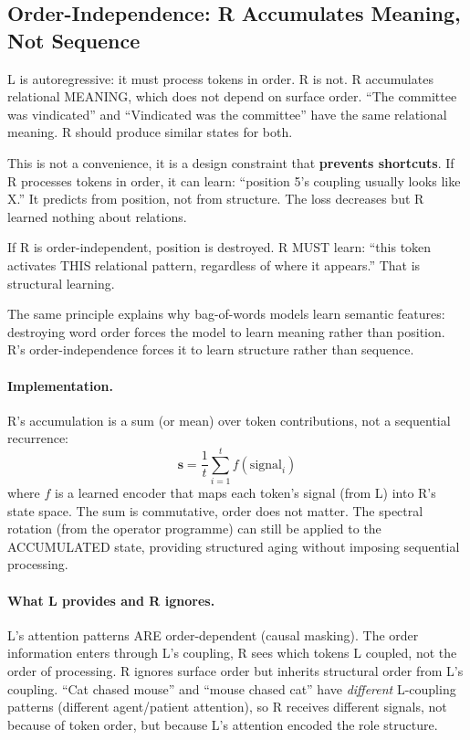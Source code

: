 \documentclass[11pt, a4paper]{article}
\theoremstyle{plain}
\theoremstyle{definition}
\theoremstyle{remark}
\begin{document}
\subsection{Order-Independence: R Accumulates Meaning, Not Sequence}
\label{sec:order-independence}

L is autoregressive: it must process tokens in order.
R is not.
R accumulates relational MEANING, which does not depend on surface order.
``The committee was vindicated'' and ``Vindicated was the committee'' have the same relational meaning.
R should produce similar states for both.

This is not a convenience, it is a design constraint that \textbf{prevents shortcuts}.
If R processes tokens in order, it can learn: ``position 5's coupling usually looks like X.''
It predicts from position, not from structure.
The loss decreases but R learned nothing about relations.

If R is order-independent, position is destroyed.
R MUST learn: ``this token activates THIS relational pattern, regardless of where it appears.''
That is structural learning.

The same principle explains why bag-of-words models learn semantic features: destroying word order forces the model to learn meaning rather than position.
R's order-independence forces it to learn structure rather than sequence.

\paragraph{Implementation.}
R's accumulation is a sum (or mean) over token contributions, not a sequential recurrence:
\begin{equation}
\mathbf{s} = \frac{1}{t} \sum_{i=1}^{t} f(\text{signal}_i)
\end{equation}
where $f$ is a learned encoder that maps each token's signal (from L) into R's state space.
The sum is commutative, order does not matter.
The spectral rotation (from the operator programme) can still be applied to the ACCUMULATED state, providing structured aging without imposing sequential processing.

\paragraph{What L provides and R ignores.}
L's attention patterns ARE order-dependent (causal masking).
The order information enters through L's coupling, R sees which tokens L coupled, not the order of processing.
R ignores surface order but inherits structural order from L's coupling.
``Cat chased mouse'' and ``mouse chased cat'' have \emph{different} L-coupling patterns (different agent/patient attention), so R receives different signals, not because of token order, but because L's attention encoded the role structure.
\end{document}
